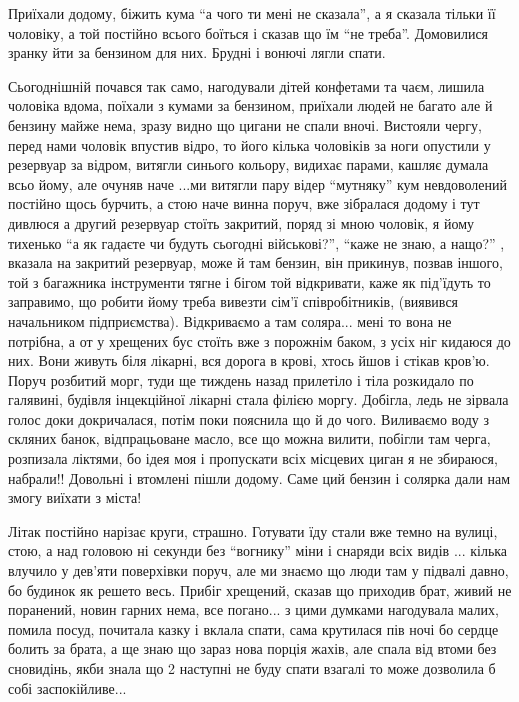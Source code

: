 Приїхали додому, біжить кума \enquote{а чого ти мені не сказала}, а я сказала тільки
її чоловіку, а той постійно всього боїться і сказав що їм \enquote{не треба}.
Домовилися зранку йти за бензином для них. Брудні і вонючі лягли спати.


Сьогоднішній почався так само, нагодували дітей конфетами та чаєм, лишила
чоловіка вдома, поїхали з кумами за бензином, приїхали людей не багато але й
бензину майже нема, зразу видно що цигани не спали вночі. Вистояли чергу, перед
нами чоловік впустив відро, то його кілька чоловіків за ноги опустили у
резервуар за відром, витягли синього кольору, видихає парами, кашляє думала
всьо йому, але очуняв наче ...ми витягли пару відер \enquote{мутняку} кум
невдоволений постійно щось бурчить, а стою наче винна поруч, вже зібралася
додому і тут дивлюся а другий резервуар стоїть закритий, поряд зі мною чоловік,
я йому тихенько \enquote{а як гадаєте чи будуть сьогодні військові?},
\enquote{каже не знаю, а нащо?} , вказала на закритий резервуар, може й там
бензин, він прикинув, позвав іншого, той з багажника інструменти тягне і бігом
той відкривати, каже як під'їдуть то заправимо, що робити йому треба вивезти
сім'ї співробітників, (виявився начальником підприємства). Відкриваємо а там
соляра... мені то вона не потрібна, а от у хрещених бус стоїть вже з порожнім
баком, з усіх ніг кидаюся до них. Вони живуть біля лікарні, вся дорога в крові,
хтось йшов і стікав кров'ю. Поруч розбитий морг, туди ще тиждень назад
прилетіло і тіла розкидало по галявині, будівля інцекційної лікарні стала
філією моргу. Добігла, ледь не зірвала голос доки докричалася, потім поки
пояснила що й до чого. Виливаємо воду з скляних банок, відпрацьоване масло, все
що можна вилити, побігли там черга, розпизала ліктями, бо ідея моя і пропускати
всіх місцевих циган я не збираюся, набрали!! Довольні і втомлені пішли додому.
Саме ций бензин і солярка дали нам змогу виїхати з міста!

Літак постійно нарізає круги, страшно. Готувати їду стали вже темно на вулиці,
стою, а над головою ні секунди без \enquote{вогнику} міни і снаряди всіх видів ... кілька
влучило у дев'яти поверхівки поруч, але ми знаємо що люди там у підвалі давно,
бо будинок як решето весь. Прибіг хрещений, сказав що приходив брат, живий не
поранений, новин гарних нема, все погано... з цими думками нагодувала малих,
помила посуд, почитала казку і вклала спати, сама крутилася пів ночі бо сердце
болить за брата, а ще знаю що зараз нова порція жахів, але спала від втоми без
сновидінь, якби знала що 2 наступні не буду спати взагалі то може дозволила б
собі заспокійливе...
